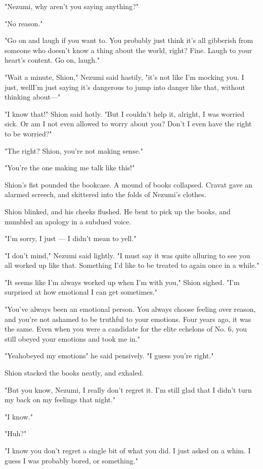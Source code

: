 "Nezumi, why aren't you saying anything?"

"No reason."

"Go on and laugh if you want to. You probably just think it's all
gibberish from someone who doesn't know a thing about the world, right?
Fine. Laugh to your heart's content. Go on, laugh."

"Wait a minute, Shion," Nezumi said hastily, "it's not like I'm mocking
you. I just, well\el I'm just saying it's dangerous to jump into danger
like that, without thinking about---"

"I know that!" Shion said hotly. "But I couldn't help it, alright, I was
worried sick. Or am I not even allowed to worry about you? Don't I even
have the right to be worried?"

"The right? Shion, you're not making sense."

"You're the one making me talk like this!"

Shion's fist pounded the bookcase. A mound of books collapsed. Cravat
gave an alarmed screech, and skittered into the folds of Nezumi's
clothes.

Shion blinked, and his cheeks flushed. He bent to pick up the books, and
mumbled an apology in a subdued voice.

"I'm sorry, I just --- I didn't mean to yell."

"I don't mind," Nezumi said lightly. "I must say it was quite alluring
to see you all worked up like that. Something I'd like to be treated to
again once in a while."

"It seems like I'm always worked up when I'm with you," Shion sighed.
"I'm surprised at how emotional I can get sometimes."

"You've always been an emotional person. You always choose feeling over
reason, and you're not ashamed to be truthful to your emotions. Four
years ago, it was the same. Even when you were a candidate for the elite
echelons of No. 6, you still obeyed your emotions and took me in."

"Yeah\el obeyed my emotions\el " he said pensively. "I guess you're
right."

Shion stacked the books neatly, and exhaled.

"But you know, Nezumi, I really don't regret it. I'm still glad that I
didn't turn my back on my feelings that night."

"I know."

"Huh?"

"I know you don't regret a single bit of what you did. I just asked on a
whim. I guess I was probably bored, or something."

